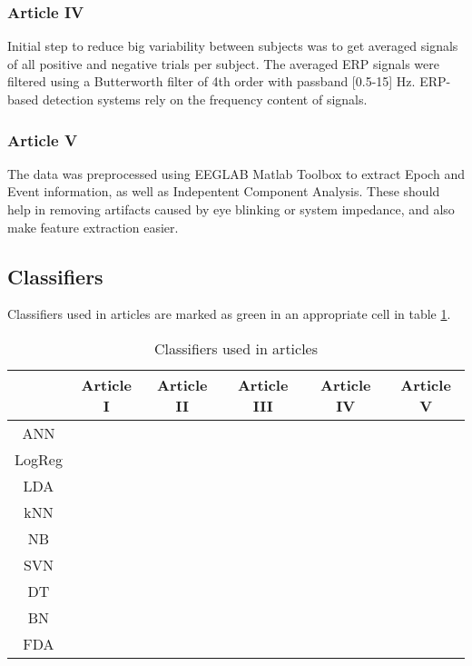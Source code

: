 \documentclass[10pt,journal,compsoc]{IEEEtran}
\begin{document}
\subsubsection*{Article IV}
Initial step to reduce big variability between subjects was to get averaged signals of all positive and negative trials per subject. The averaged ERP signals were filtered using a Butterworth filter of 4th order with passband [0.5-15] Hz. ERP-based detection systems rely on the frequency content of signals.

\subsubsection*{Article V}
The data was preprocessed using EEGLAB Matlab Toolbox to extract Epoch and Event information, as well as Indepentent Component Analysis. These should help in removing artifacts caused by eye blinking or system impedance, and also make feature extraction easier.

\subsection{Classifiers}
Classifiers used in articles are marked as green in an appropriate cell in table \ref{table_classifiers}.
\begin{table}[!t]
\renewcommand{\arraystretch}{1.3}
\caption{Classifiers used in articles}
\label{table_classifiers}
\centering
\setlength\tabcolsep{2pt}
\begin{tabular}{|c|c|c|c|c|c|}
\hline &Article I&Article II&Article III&Article IV&Article V\\\hline
ANN&&&\cellcolor{green}&\cellcolor{green}&\cellcolor{green}\\\hline
LogReg&&&&\cellcolor{green}&\\\hline
LDA&&&&\cellcolor{green}&\\\hline
kNN&&&\cellcolor{green}&\cellcolor{green}&\cellcolor{green}\\\hline
NB&&&&\cellcolor{green}&\\\hline
SVN&&\cellcolor{green}&\cellcolor{green}&\cellcolor{green}&\cellcolor{green}\\\hline
DT&&&&\cellcolor{green}&\\\hline
BN&&&\cellcolor{green}&&\cellcolor{green}\\\hline
FDA&\cellcolor{green}&&&&\\\hline
\end{tabular}
\end{table}
\end{document}
